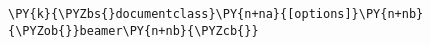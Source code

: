 \begin{Verbatim}[commandchars=\\\{\}]
\PY{k}{\PYZbs{}documentclass}\PY{n+na}{[options]}\PY{n+nb}{\PYZob{}}beamer\PY{n+nb}{\PYZcb{}}
\end{Verbatim}
